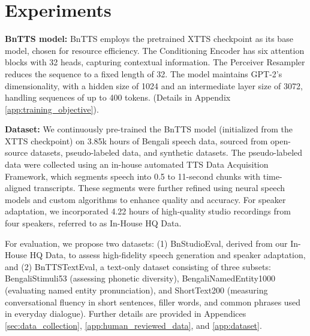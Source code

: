 \section{Experiments}

\noindent \textbf{BnTTS model:} BnTTS employs the pretrained XTTS checkpoint \cite{casanova2024xtts} as its base model, chosen for resource efficiency. The Conditioning Encoder has six attention blocks with 32 heads, capturing contextual information. The Perceiver Resampler reduces the sequence to a fixed length of 32. The model maintains GPT-2’s dimensionality, with a hidden size of 1024 and an intermediate layer size of 3072, handling sequences of up to 400 tokens. (Details in Appendix \ref{app:training_objective}).

\noindent \textbf{Dataset:} We continuously pre-trained the BnTTS model (initialized from the XTTS checkpoint) on 3.85k hours of Bengali speech data, sourced from open-source datasets, pseudo-labeled data, and synthetic datasets. The pseudo-labeled data were collected using an in-house automated TTS Data Acquisition Framework, which segments speech into 0.5 to 11-second chunks with time-aligned transcripts. These segments were further refined using neural speech models and custom algorithms to enhance quality and accuracy. For speaker adaptation, we incorporated 4.22 hours of high-quality studio recordings from four speakers, referred to as In-House HQ Data.

For evaluation, we propose two datasets: (1) BnStudioEval, derived from our In-House HQ Data, to assess high-fidelity speech generation and speaker adaptation, and (2) BnTTSTextEval, a text-only dataset consisting of three subsets: BengaliStimuli53 (assessing phonetic diversity), BengaliNamedEntity1000 (evaluating named entity pronunciation), and ShortText200 (measuring conversational fluency in short sentences, filler words, and common phrases used in everyday dialogue). Further details are provided in Appendices \ref{sec:data_collection}, \ref{app:human_reviewed_data}, and \ref{app:dataset}.



